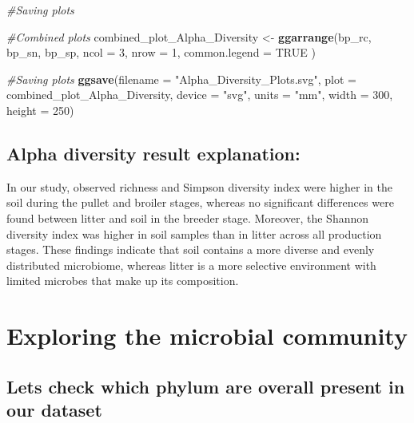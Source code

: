 \documentclass[
]{article}
\newenvironment{Shaded}{\begin{snugshade}}{\end{snugshade}}
\newcommand{\AttributeTok}[1]{\textcolor[rgb]{0.13,0.29,0.53}{#1}}
\newcommand{\CommentTok}[1]{\textcolor[rgb]{0.56,0.35,0.01}{\textit{#1}}}
\newcommand{\ConstantTok}[1]{\textcolor[rgb]{0.56,0.35,0.01}{#1}}
\newcommand{\DecValTok}[1]{\textcolor[rgb]{0.00,0.00,0.81}{#1}}
\newcommand{\FunctionTok}[1]{\textcolor[rgb]{0.13,0.29,0.53}{\textbf{#1}}}
\newcommand{\NormalTok}[1]{#1}
\newcommand{\OtherTok}[1]{\textcolor[rgb]{0.56,0.35,0.01}{#1}}
\newcommand{\StringTok}[1]{\textcolor[rgb]{0.31,0.60,0.02}{#1}}
\begin{document}
\begin{Shaded}
\begin{Highlighting}[]
\CommentTok{\#Saving plots}

\CommentTok{\#Combined plots}
\NormalTok{combined\_plot\_Alpha\_Diversity }\OtherTok{\textless{}{-}} \FunctionTok{ggarrange}\NormalTok{(bp\_rc, bp\_sn, bp\_sp,}
                           \AttributeTok{ncol =} \DecValTok{3}\NormalTok{,}
                           \AttributeTok{nrow =} \DecValTok{1}\NormalTok{,}
                           \AttributeTok{common.legend =} \ConstantTok{TRUE}
\NormalTok{)}


\CommentTok{\#Saving plots}
\FunctionTok{ggsave}\NormalTok{(}\AttributeTok{filename =} \StringTok{"Alpha\_Diversity\_Plots.svg"}\NormalTok{,}
       \AttributeTok{plot =}\NormalTok{ combined\_plot\_Alpha\_Diversity,}
       \AttributeTok{device =} \StringTok{"svg"}\NormalTok{,}
       \AttributeTok{units =} \StringTok{"mm"}\NormalTok{,}
       \AttributeTok{width =} \DecValTok{300}\NormalTok{,}
       \AttributeTok{height =} \DecValTok{250}\NormalTok{)}
\end{Highlighting}
\end{Shaded}

\subsection{Alpha diversity result
explanation:}\label{alpha-diversity-result-explanation}

In our study, observed richness and Simpson diversity index were higher
in the soil during the pullet and broiler stages, whereas no significant
differences were found between litter and soil in the breeder stage.
Moreover, the Shannon diversity index was higher in soil samples than in
litter across all production stages. These findings indicate that soil
contains a more diverse and evenly distributed microbiome, whereas
litter is a more selective environment with limited microbes that make
up its composition.

\section{\texorpdfstring{\textbf{Exploring the microbial
community}}{Exploring the microbial community}}\label{exploring-the-microbial-community}

\subsection{Lets check which phylum are overall present in our
dataset}\label{lets-check-which-phylum-are-overall-present-in-our-dataset}
\end{document}
